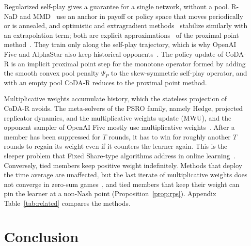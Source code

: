 \documentclass{article}
\theoremstyle{plain}
\theoremstyle{remark}
\newcommand{\codar}{CoDA-R}
\begin{document}
Regularized self-play gives a guarantee for a single network, without a pool. R-NaD and MMD~\citep{perolat2021rnad,perolat2022stratego,sokota2023mmd} use an anchor in payoff or policy space that moves periodically or is annealed, and optimistic and extragradient methods~\citep{daskalakis2018optimism,mertikopoulos2019omd,nemirovski2004prox,cen2021extragradient} stabilize similarly with an extrapolation term; both are explicit approximations~\citep{mokhtari2020ppa} of the proximal point method~\citep{rockafellar1976ppa}. They train only along the self-play trajectory, which is why OpenAI Five and AlphaStar also keep historical opponents~\citep{openai2019dota,vinyals2019alphastar,czarnecki2020spinning}. The policy update of \codar{} is an implicit proximal point step for the monotone operator formed by adding the smooth convex pool penalty $\Psi_P$ to the skew-symmetric self-play operator, and with an empty pool \codar{} reduces to the proximal point method.

Multiplicative weights accumulate history, which the stateless projection of \codar{} avoids. The meta-solvers of the PSRO family, namely Hedge, projected replicator dynamics, and the multiplicative weights update (MWU), and the opponent sampler of OpenAI Five mostly use multiplicative weights~\citep{lanctot2017psro,mcaleer2022anytime,dinh2022odo,openai2019dota,freund1999hedge}. After a member has been suppressed for $T$ rounds, it has to win for roughly another $T$ rounds to regain its weight even if it counters the learner again. This is the sleeper problem that Fixed Share-type algorithms address in online learning~\citep{herbster1998tracking}. Conversely, tied members keep positive weight indefinitely. Methods that deploy the time average are unaffected, but the last iterate of multiplicative weights does not converge in zero-sum games~\citep{bailey2018mwu}, and tied members that keep their weight can pin the learner at a non-Nash point (Proposition~\ref{prop:rps}). Appendix Table~\ref{tab:related} compares the methods.

\section{Conclusion}
\end{document}
